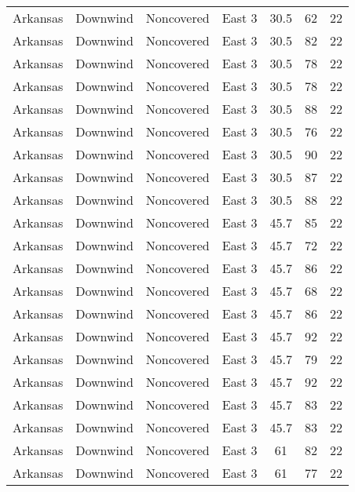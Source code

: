 \documentclass{article}
\begin{document}
\begin{longtable}[H]{ccccccc}
Arkansas & Downwind  & Noncovered & East 3        & 30.5         & 62          & 22  \\
Arkansas & Downwind  & Noncovered & East 3        & 30.5         & 82          & 22  \\
Arkansas & Downwind  & Noncovered & East 3        & 30.5         & 78          & 22  \\
Arkansas & Downwind  & Noncovered & East 3        & 30.5         & 78          & 22  \\
Arkansas & Downwind  & Noncovered & East 3        & 30.5         & 88          & 22  \\
Arkansas & Downwind  & Noncovered & East 3        & 30.5         & 76          & 22  \\
Arkansas & Downwind  & Noncovered & East 3        & 30.5         & 90          & 22  \\
Arkansas & Downwind  & Noncovered & East 3        & 30.5         & 87          & 22  \\
Arkansas & Downwind  & Noncovered & East 3        & 30.5         & 88          & 22  \\
Arkansas & Downwind  & Noncovered & East 3        & 45.7         & 85          & 22  \\
Arkansas & Downwind  & Noncovered & East 3        & 45.7         & 72          & 22  \\
Arkansas & Downwind  & Noncovered & East 3        & 45.7         & 86          & 22  \\
Arkansas & Downwind  & Noncovered & East 3        & 45.7         & 68          & 22  \\
Arkansas & Downwind  & Noncovered & East 3        & 45.7         & 86          & 22  \\
Arkansas & Downwind  & Noncovered & East 3        & 45.7         & 92          & 22  \\
Arkansas & Downwind  & Noncovered & East 3        & 45.7         & 79          & 22  \\
Arkansas & Downwind  & Noncovered & East 3        & 45.7         & 92          & 22  \\
Arkansas & Downwind  & Noncovered & East 3        & 45.7         & 83          & 22  \\
Arkansas & Downwind  & Noncovered & East 3        & 45.7         & 83          & 22  \\
Arkansas & Downwind  & Noncovered & East 3        & 61           & 82          & 22  \\
Arkansas & Downwind  & Noncovered & East 3        & 61           & 77          & 22  \\

\end{longtable}
\end{document}
